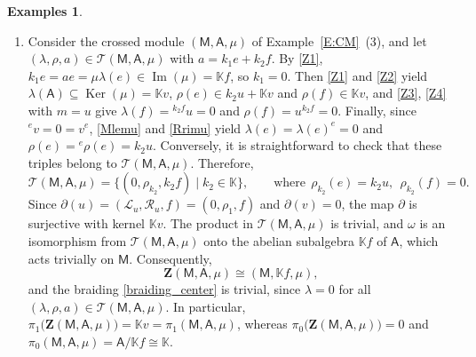 \documentclass[12pt,reqno]{amsart}
\theoremstyle{plain}
\theoremstyle{definition}
\newtheorem{examples}[theorem]{Examples}
\theoremstyle{remark}
\def\lam{\lambda}
\def\Ker{\operatorname{Ker}}
\def\Im{\operatorname{Im}}
\newcommand{\K}{\ensuremath{\mathbb{K}}}
\newcommand{\A}{\ensuremath{\mathsf{A}}}
\newcommand{\MM}{\ensuremath{\mathsf{M}}}
\newcommand{\ZC}{\ensuremath{\mathbf{Z}}}
\newcommand{\T}{\ensuremath{\mathcal{T}}}
\newcommand{\LL}{\ensuremath{\mathcal{L}}}
\newcommand{\RR}{\ensuremath{\mathcal{R}}}
\numberwithin{equation}{section}
\begin{document}
\begin{examples}
\begin{enumerate}
		\item Consider the crossed module $(\MM,\A,\mu)$ of Example~\ref{E:CM}~(3), and let $(\lam,\rho,a)\in\T(\MM,\A,\mu)$ with $a=k_1 e+k_2 f$. By \eqref{Z1}, $k_1 e=ae=\mu\lam(e)\in\Im(\mu)=\K f$, so $k_1=0$. Then \eqref{Z1} and \eqref{Z2} yield $\lam(\A)\subseteq\Ker(\mu)=\K v$, $\rho(e)\in k_2 u+\K v$ and $\rho(f)\in\K v$, and \eqref{Z3}, \eqref{Z4} with $m=u$ give $\lam(f)={}^{k_2 f}u=0$ and $\rho(f)=u^{k_2 f}=0$. Finally, since ${}^ev=0=v^e$, \eqref{Mlemu} and \eqref{Rrimu} yield $\lam(e)=\lam(e)^e=0$ and $\rho(e)={}^e\rho(e)=k_2 u$. Conversely, it is straightforward to check that these triples belong to $\T(\MM,\A,\mu)$. Therefore,
		\[
		\T(\MM,\A,\mu)=\{(0,\rho_{k_2},k_2 f)\mid k_2\in\K\}, \qquad \text{where} \ \ \rho_{k_2}(e)=k_2 u, \ \ \rho_{k_2}(f)=0.
		\]
		Since $\partial(u)=(\LL_u,\RR_u,f)=(0,\rho_1,f)$ and $\partial(v)=0$, the map $\partial$ is surjective with kernel $\K v$. The product in $\T(\MM,\A,\mu)$ is trivial, and $\omega$ is an isomorphism from $\T(\MM,\A,\mu)$ onto the abelian subalgebra $\K f$ of $\A$, which acts trivially on $\MM$. Consequently,
		\[
		\ZC(\MM,\A,\mu)\cong(\MM,\K f,\mu),
		\]
		and the braiding \eqref{braiding_center} is trivial, since $\lam=0$ for all $(\lam,\rho,a)\in\T(\MM,\A,\mu)$. In particular, $\pi_1\big(\ZC(\MM,\A,\mu)\big)=\K v=\pi_1(\MM,\A,\mu)$, whereas $\pi_0\big(\ZC(\MM,\A,\mu)\big)=0$ and $\pi_0(\MM,\A,\mu)=\A/\K f\cong\K$.	
	\end{enumerate}
\end{examples}
\end{document}
